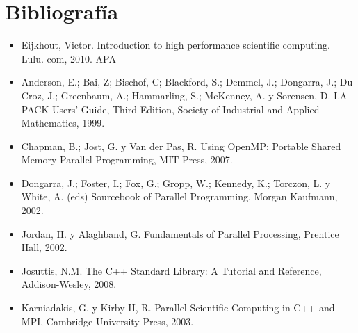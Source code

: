 \documentclass[letterpaper]{article}
\begin{document}
\section*{Bibliografía} %
\begin{itemize}
\item Eijkhout, Victor. Introduction to high performance scientific computing. Lulu. com, 2010.
APA	
    \item Anderson, E.; Bai, Z; Bischof, C; Blackford, S.; Demmel, J.; Dongarra, J.; Du Croz, J.; Greenbaum, A.; Hammarling, S.; McKenney, A. y Sorensen, D. LA-PACK Users’ Guide, Third Edition, Society of Industrial and Applied Mathematics, 1999.
    \item Chapman, B.; Jost, G. y Van der Pas, R. Using OpenMP: Portable Shared Memory Parallel Programming, MIT Press, 2007.
    \item Dongarra, J.; Foster, I.; Fox, G.; Gropp, W.; Kennedy, K.; Torczon, L. y White, A. (eds) Sourcebook of Parallel Programming, Morgan Kaufmann, 2002.
    \item Jordan, H. y Alaghband, G. Fundamentals of Parallel Processing, Prentice Hall, 2002.
    \item Josuttis, N.M. The C++ Standard Library: A Tutorial and Reference, Addison-Wesley, 2008.
    \item Karniadakis, G. y Kirby II, R. Parallel Scientific Computing in C++ and MPI, Cambridge University Press, 2003.
\end{itemize}
\end{document}
